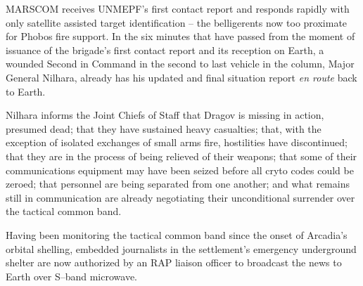 MARSCOM receives UNMEPF's first contact report and responds rapidly with only satellite assisted target identification -- the belligerents now too proximate for Phobos fire support. In the six minutes that have passed from the moment of issuance of the brigade's first contact report and its reception on Earth, a wounded Second in Command in the second to last vehicle in the column, Major General Nilhara, already has his updated and final situation report {\it en route} back to Earth.

Nilhara informs the Joint Chiefs of Staff that Dragov is missing in action, presumed dead; that they have sustained heavy casualties; that, with the exception of isolated exchanges of small arms fire, hostilities have discontinued; that they are in the process of being relieved of their weapons; that some of their communications equipment may have been seized before all cryto codes could be zeroed; that personnel are being separated from one another; and what remains still in communication are already negotiating their unconditional surrender over the tactical common band.

Having been monitoring the tactical common band since the onset of Arcadia's orbital shelling, embedded journalists in the settlement's emergency underground shelter are now authorized by an RAP liaison officer to broadcast the news to Earth over S--band microwave.
\StopTimelineDate

